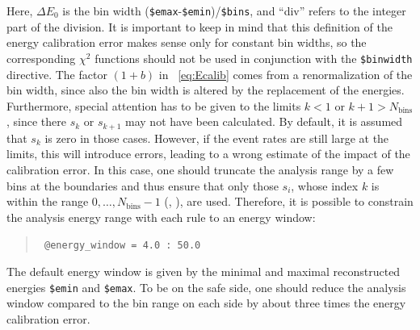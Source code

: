Here, $\Delta E_0$ is the bin width ({\tt \$emax}-{\tt \$emin})/{\tt \$bins},
and ``div'' refers to the integer part of the division. It is important
to keep in mind that this definition of the energy calibration error 
makes sense only for constant bin widths, so the corresponding $\chi^2$
functions should not be used in conjunction with the {\tt \$binwidth} directive.
The factor $(1+b)$ in \eq~\eqref{eq:Ecalib} comes from a renormalization of
the bin width, since also the bin width is altered by the replacement of
the energies. Furthermore, special attention has to be given to the limits
 $k<1$ or $k+1>N_\mathrm{bins}$, since there $s_k$ or $s_{k+1}$ may not have been calculated. By default, it is assumed that $s_k$ is
zero in those cases. However, if the event rates are still large at
the limits, this will introduce errors, leading to a wrong
estimate of the impact of the calibration error. In this case,
one should truncate the analysis range by a few bins at the boundaries
and thus ensure that only those $s_i$, whose index
$k$ is within the range $0,\ldots, N_\mathrm{bins}-1$ (\cf, ), are used.
Therefore, it is possible to constrain the analysis energy range 
with each rule to an energy window:
\begin{quote}
{\tt 
\tb @energy\_window = 4.0 : 50.0 
}
\end{quote}
The default energy window is given by the minimal and maximal reconstructed
energies {\tt \$emin} and {\tt \$emax}. To be on the safe side, one should
reduce the analysis window compared to the bin range on each side by about
three times the energy calibration error.

